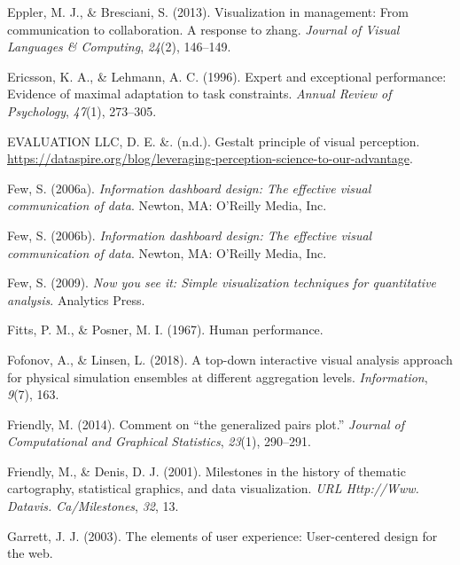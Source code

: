 \documentclass[print]{nuthesis}
\newlength{\cslhangindent}
\newenvironment{CSLReferences}[2]%
{\setlength{\parindent}{0pt}%
\everypar{\setlength{\hangindent}{\cslhangindent}}\ignorespaces}%
{\par}
\begin{document}
\begin{CSLReferences}{1}{0}
\leavevmode{}%
Eppler, M. J., \& Bresciani, S. (2013). Visualization in management: From communication to collaboration. A response to zhang. \emph{Journal of Visual Languages \& Computing}, \emph{24}(2), 146--149.

\leavevmode{}%
Ericsson, K. A., \& Lehmann, A. C. (1996). Expert and exceptional performance: Evidence of maximal adaptation to task constraints. \emph{Annual Review of Psychology}, \emph{47}(1), 273--305.

\leavevmode{}%
EVALUATION LLC, D. E. \&. (n.d.). Gestalt principle of visual perception. \url{https://dataspire.org/blog/leveraging-perception-science-to-our-advantage}.

\leavevmode{}%
Few, S. (2006a). \emph{Information dashboard design: The effective visual communication of data}. Newton, MA: O'Reilly Media, Inc.

\leavevmode{}%
Few, S. (2006b). \emph{Information dashboard design: The effective visual communication of data}. Newton, MA: O'Reilly Media, Inc.

\leavevmode{}%
Few, S. (2009). \emph{Now you see it: Simple visualization techniques for quantitative analysis}. Analytics Press.

\leavevmode{}%
Fitts, P. M., \& Posner, M. I. (1967). Human performance.

\leavevmode{}%
Fofonov, A., \& Linsen, L. (2018). A top-down interactive visual analysis approach for physical simulation ensembles at different aggregation levels. \emph{Information}, \emph{9}(7), 163.

\leavevmode{}%
Friendly, M. (2014). Comment on {``the generalized pairs plot.''} \emph{Journal of Computational and Graphical Statistics}, \emph{23}(1), 290--291.

\leavevmode{}%
Friendly, M., \& Denis, D. J. (2001). Milestones in the history of thematic cartography, statistical graphics, and data visualization. \emph{URL Http://Www. Datavis. Ca/Milestones}, \emph{32}, 13.

\leavevmode{}%
Garrett, J. J. (2003). The elements of user experience: User-centered design for the web.


\end{CSLReferences}
\end{document}
